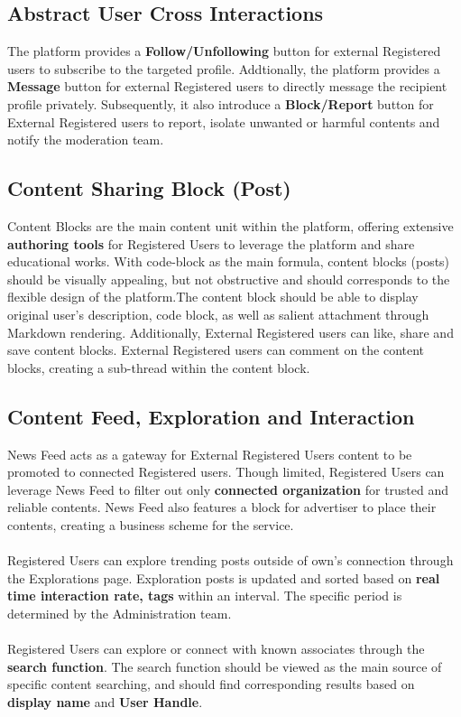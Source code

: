         \subsection{Abstract User Cross Interactions}
        The platform provides a \textbf{Follow/Unfollowing} button for external Registered users to subscribe to the targeted profile. Addtionally, the platform provides a 
        \textbf{Message} button for external Registered users to directly message the recipient profile privately. Subsequently, it also introduce a \textbf{Block/Report}
        button for External Registered users to report, isolate unwanted or harmful contents and notify the moderation team.
        
        \subsection{Content Sharing Block (Post)}
        Content Blocks are the main content unit within the platform, offering extensive \textbf{authoring tools} for Registered Users to leverage the platform and share educational
        works. With code-block as the main formula, content blocks (posts) should be visually appealing, but not obstructive and should corresponds to the flexible design of 
        the platform.The content block should be able to display original user's description, code block, as well as salient attachment through Markdown rendering. Additionally, 
        External Registered users can like, share and save content blocks. External Registered users can comment on the content blocks, creating a sub-thread within the 
        content block.

        \subsection{Content Feed, Exploration and Interaction}
        News Feed acts as a gateway for External Registered Users content to be promoted to connected Registered users. Though limited, Registered Users can leverage News Feed
        to filter out only \textbf{connected organization} for trusted and reliable contents. News Feed also features a block for advertiser to place their contents, creating
        a business scheme for the service.
        \\\\
        Registered Users can explore trending posts outside of own's connection through the Explorations page. Exploration posts is updated and sorted based on 
        \textbf{real time interaction rate, tags} within an interval. The specific period is determined by the Administration team.
        \\\\
        Registered Users can explore or connect with known associates through the \textbf{search function}. The search function should be viewed as the main source of specific 
        content searching, and should find corresponding results based on \textbf{display name} and \textbf{User Handle}.

